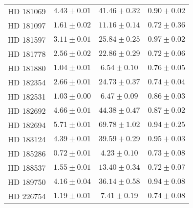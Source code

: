 \begin{table}
\begin{tabular}{cccc}
HD 181069 & $4.43 \pm 0.01$ & $41.46 \pm 0.32$ & $0.90 \pm 0.02$ \\
HD 181097 & $1.61 \pm 0.02$ & $11.16 \pm 0.14$ & $0.72 \pm 0.36$ \\
HD 181597 & $3.11 \pm 0.01$ & $25.84 \pm 0.25$ & $0.97 \pm 0.02$ \\
HD 181778 & $2.56 \pm 0.02$ & $22.86 \pm 0.29$ & $0.72 \pm 0.06$ \\
HD 181880 & $1.04 \pm 0.01$ & $6.54 \pm 0.10$ & $0.76 \pm 0.05$ \\
HD 182354 & $2.66 \pm 0.01$ & $24.73 \pm 0.37$ & $0.74 \pm 0.04$ \\
HD 182531 & $1.03 \pm 0.00$ & $6.47 \pm 0.09$ & $0.86 \pm 0.03$ \\
HD 182692 & $4.66 \pm 0.01$ & $44.38 \pm 0.47$ & $0.87 \pm 0.02$ \\
HD 182694 & $5.71 \pm 0.01$ & $69.78 \pm 1.02$ & $0.94 \pm 0.25$ \\
HD 183124 & $4.39 \pm 0.01$ & $39.59 \pm 0.29$ & $0.95 \pm 0.03$ \\
HD 185286 & $0.72 \pm 0.01$ & $4.23 \pm 0.10$ & $0.73 \pm 0.08$ \\
HD 188537 & $1.55 \pm 0.01$ & $13.40 \pm 0.34$ & $0.72 \pm 0.07$ \\
HD 189750 & $4.16 \pm 0.04$ & $36.14 \pm 0.58$ & $0.94 \pm 0.08$ \\
HD 226754 & $1.19 \pm 0.01$ & $7.41 \pm 0.19$ & $0.74 \pm 0.08$ \\
\hline
\end{tabular}
\end{table}

